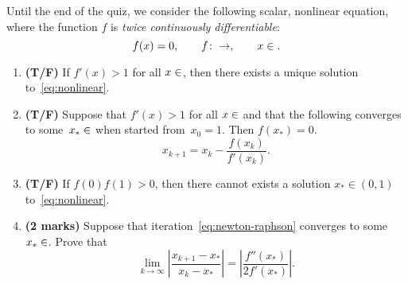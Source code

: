 \documentclass{article}
\begin{document}
Until the end of the quiz, we consider the following scalar, nonlinear equation,
where the function $f$ is \emph{twice continuously differentiable}:
\begin{equation}
    \label{eq:nonlinear}
    f(x) = 0,
    \qquad f\colon \real \to \real,
    \qquad x \in \real.
\end{equation}
\begin{enumerate}
    \item
        \textbf{(T/F)}
        If $f'(x) > 1$ for all $x \in \real$,
        then there exists a unique solution to~\eqref{eq:nonlinear}.

    \item
        \textbf{(T/F)}
        Suppose that $f'(x) > 1$ for all $x \in \real$
        and that the following converges to some~$x_* \in \real$ when started from~$x_0 = 1$.
        Then $f(x_*) = 0$.
        \begin{equation}
            \label{eq:newton-raphson}
            x_{k+1} = x_k - \frac{f(x_k)}{f'(x_k)}.
        \end{equation}

    \item
        \textbf{(T/F)}
        If $f(0) f(1) > 0$,
        then there cannot exists a solution $x_* \in (0, 1)$ to~\eqref{eq:nonlinear}.

    \item
        \textbf{(2 marks)}
        Suppose that iteration~\eqref{eq:newton-raphson} converges to some~$x_* \in \real$.
        Prove that
        \[
            \lim_{k \to \infty} \left\lvert \frac{x_{k+1} - x_*}{x_{k} - x_*} \right\rvert = \left\lvert \frac{f''(x_*)}{2f'(x_*)} \right\rvert.
        \]
\end{enumerate}
\end{document}
